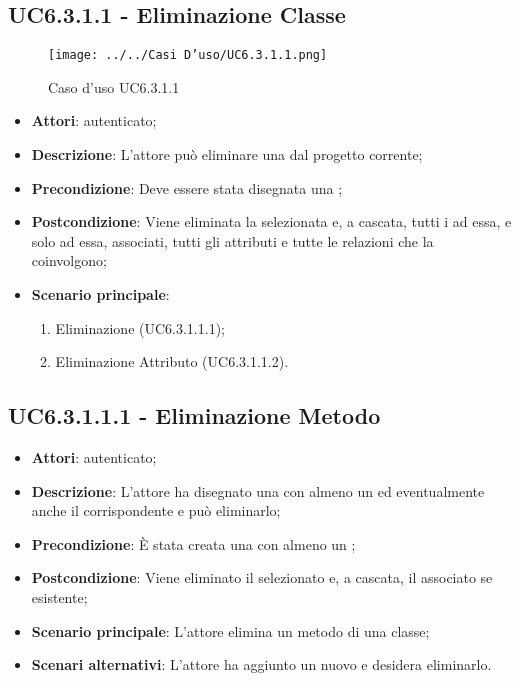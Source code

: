 \subsection{UC6.3.1.1 - Eliminazione Classe}
\label{ssec:UC6.3.1.1}
\begin{figure}[h!]
\centering
\texttt{[image: ../../Casi D'uso/UC6.3.1.1.png]}
\caption{Caso d'uso UC6.3.1.1}
 \end{figure}
\begin{itemize}
\item \textbf{Attori}:  autenticato;
\item \textbf{Descrizione}: L'attore può eliminare una  dal progetto corrente;
\item \textbf{Precondizione}: Deve essere stata disegnata una ;
\item \textbf{Postcondizione}: Viene eliminata la  selezionata e, a cascata, tutti i  ad essa, e solo ad essa, associati, tutti gli attributi e tutte le relazioni che la coinvolgono;
\item \textbf{Scenario principale}: \begin{enumerate}\item Eliminazione  (UC6.3.1.1.1);\item Eliminazione Attributo (UC6.3.1.1.2).
 \end{enumerate}
\end{itemize}
\subsection{UC6.3.1.1.1 - Eliminazione Metodo}
\label{ssec:UC6.3.1.1.1}
\begin{itemize}
\item \textbf{Attori}:  autenticato;
\item \textbf{Descrizione}: L'attore ha disegnato una  con almeno un  ed  eventualmente anche il  corrispondente e può eliminarlo;
\item \textbf{Precondizione}: È stata creata una  con almeno un ;
\item \textbf{Postcondizione}: Viene eliminato il  selezionato e, a cascata, il  associato se esistente;
\item \textbf{Scenario principale}: L'attore elimina un metodo di una classe;
\item \textbf{Scenari alternativi}: L'attore ha aggiunto un nuovo  e desidera eliminarlo.
\end{itemize}
